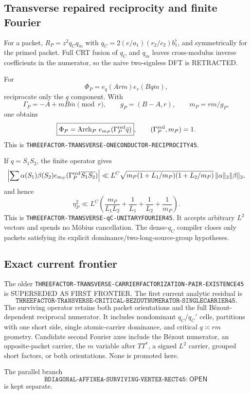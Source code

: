 \documentclass[11pt]{article}
\theoremstyle{definition}
\newcommand{\1}{\mathbf 1}
\newcommand{\status}[1]{\textsf{#1}}
\begin{document}
\subsection{Transverse repaired reciprocity and finite Fourier}
For a packet, $R_P=z^2q_Cq_m$ with
$q_C=2(e/a_1)(r_2/c_2)b_1^\flat$, and symmetrically for the primed packet. Full CRT fusion of
$q_C$ and $q_m$ leaves cross-modulus inverse coefficients in the numerator, so the naive
two-signless DFT is \status{RETRACTED}.

For
\[
\Phi_P=e_q(A\overline{rm})e_r(B\overline{qm}),
\]
reciprocate only the $q$ component. With
\[
\Gamma_P=-A+mB\overline m\pmod r,\qquad g_P=(B-A,r),\qquad m_P=rm/g_P,
\]
one obtains
\[
\boxed{\Phi_P=\operatorname{Arch}_P\,e_{m_P}(\Gamma_P^{\rm red}\bar q)},\qquad
(\Gamma_P^{\rm red},m_P)=1.
\]
This is \texttt{THREEFACTOR-TRANSVERSE-ONECONDUCTOR-RECIPROCITY45}.

If $q=S_1S_2$, the finite operator gives
\[
\left|\sum\alpha(S_1)\beta(S_2)e_{m_P}(\Gamma_P^{\rm red}\overline{S_1}\overline{S_2})\right|
\ll L^C\sqrt{m_P(1+L_1/m_P)(1+L_2/m_P)}\,\|\alpha\|_2\|\beta\|_2,
\]
and hence
\[
\boxed{\eta_P^2\ll L^C\left(\frac{m_P}{L_1L_2}+\frac1{L_1}+\frac1{L_2}+\frac1{m_P}\right)}.
\]
This is \texttt{THREEFACTOR-TRANSVERSE-qC-UNITARYFOURIER45}. It accepts arbitrary $L^2$
vectors and spends no M\"obius cancellation. The dense-$q_C$ compiler closes only packets
satisfying its explicit dominance/two-long-source-group hypotheses.

\subsection{Exact current frontier}
The older \texttt{THREEFACTOR-TRANSVERSE-CARRIERFACTORIZATION-PAIR-EXISTENCE45} is
\status{SUPERSEDED AS FIRST FRONTIER}. The first current analytic residual is
\[
\boxed{\texttt{THREEFACTOR-TRANSVERSE-CRITICAL-BEZOUTNUMERATOR-SINGLECARRIER45}}.
\]
The surviving operator retains both packet orientations and the full B\'ezout-dependent
reciprocal numerator. It includes nondominant $q_C$/$q_C'$ cells, partitions with one short
side, single atomic-carrier dominance, and critical $q\asymp rm$ geometry. Candidate second
Fourier axes include the B\'ezout numerator, an opposite-packet carrier, the $m$ variable
after $TT^*$, a signed $L^2$ carrier, grouped short factors, or both orientations. None is
promoted here.

The parallel branch
\[
\boxed{\texttt{BDIAGONAL-AFFINEA-SURVIVING-VERTEX-RECT45}:\ \status{OPEN}}
\]
is kept separate.
\end{document}
